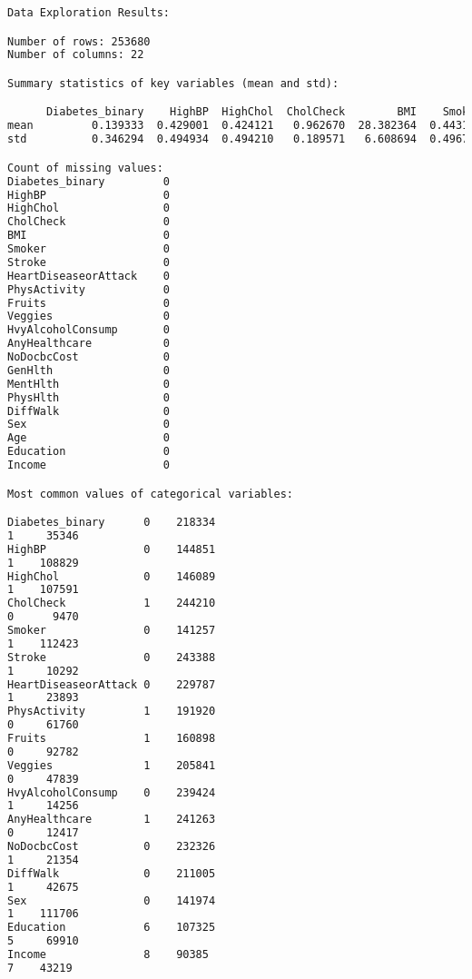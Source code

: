 \documentclass[12pt]{article}
\begin{document}
\begin{lstlisting}[language=TeX]
Data Exploration Results:

Number of rows: 253680
Number of columns: 22

Summary statistics of key variables (mean and std):

      Diabetes_binary    HighBP  HighChol  CholCheck        BMI    Smoker    Stroke  HeartDiseaseorAttack  PhysActivity    Fruits   Veggies  HvyAlcoholConsump  AnyHealthcare  NoDocbcCost   GenHlth  MentHlth  PhysHlth  DiffWalk       Sex       Age  Education    Income
mean         0.139333  0.429001  0.424121   0.962670  28.382364  0.443169  0.040571              0.094186      0.756544  0.634256  0.811420           0.056197       0.951053     0.084177  2.511392  3.184772  4.242081  0.168224  0.440342  8.032119   5.050434  6.053875
std          0.346294  0.494934  0.494210   0.189571   6.608694  0.496761  0.197294              0.292087      0.429169  0.481639  0.391175           0.230302       0.215759     0.277654  1.068477  7.412847  8.717951  0.374066  0.496429  3.054220   0.985774  2.071148

Count of missing values:
Diabetes_binary         0
HighBP                  0
HighChol                0
CholCheck               0
BMI                     0
Smoker                  0
Stroke                  0
HeartDiseaseorAttack    0
PhysActivity            0
Fruits                  0
Veggies                 0
HvyAlcoholConsump       0
AnyHealthcare           0
NoDocbcCost             0
GenHlth                 0
MentHlth                0
PhysHlth                0
DiffWalk                0
Sex                     0
Age                     0
Education               0
Income                  0

Most common values of categorical variables:

Diabetes_binary      0    218334
1     35346
HighBP               0    144851
1    108829
HighChol             0    146089
1    107591
CholCheck            1    244210
0      9470
Smoker               0    141257
1    112423
Stroke               0    243388
1     10292
HeartDiseaseorAttack 0    229787
1     23893
PhysActivity         1    191920
0     61760
Fruits               1    160898
0     92782
Veggies              1    205841
0     47839
HvyAlcoholConsump    0    239424
1     14256
AnyHealthcare        1    241263
0     12417
NoDocbcCost          0    232326
1     21354
DiffWalk             0    211005
1     42675
Sex                  0    141974
1    111706
Education            6    107325
5     69910
Income               8    90385
7    43219


\end{lstlisting}
\end{document}
